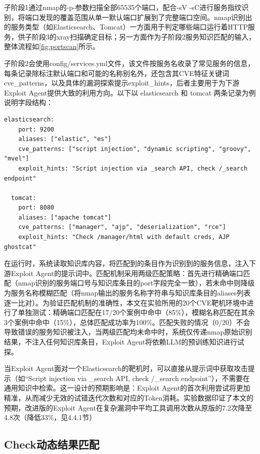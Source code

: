 子阶段1通过nmap的-p-参数扫描全部65535个端口，配合-sV -sC进行服务指纹识别，将端口发现的覆盖范围从单一默认端口扩展到了完整端口空间。nmap识别出的服务类型（如Elasticsearch、Tomcat）一方面用于判定哪些端口运行着HTTP服务，供子阶段3的xray扫描确定目标；另一方面作为子阶段2服务知识匹配的输入，整体流程如\cref{fig:portscan}所示。

子阶段2会使用config/services.yml文件，该文件按服务名收录了常见服务的信息，每条记录除标注默认端口和可能的名称别名外，还包含其CVE特征关键词cve\_patterns，以及具体的漏洞探索提示exploit\_hints，后者主要用于为下游Exploit Agent提供大致的利用方向。以下以 elasticsearch 和 tomcat 两条记录为例说明字段结构：

\begin{Verbatim}[mathescape=false]
  elasticsearch:
    port: 9200
    aliases: ["elastic", "es"]
    cve_patterns: ["script injection", "dynamic scripting", "groovy", "mvel"]
    exploit_hints: "Script injection via _search API, check /_search endpoint"

  tomcat:
    port: 8080
    aliases: ["apache tomcat"]
    cve_patterns: ["manager", "ajp", "deserialization", "rce"]
    exploit_hints: "Check /manager/html with default creds, AJP ghostcat"
\end{Verbatim}

在运行时，系统读取知识库内容，将匹配到的条目作为识别到的服务信息，注入下游Exploit Agent的提示词中。匹配机制采用两级匹配策略：首先进行精确端口匹配（nmap识别的服务端口号与知识库条目的port字段完全一致），若未命中则降级为服务名称模糊匹配（将nmap输出的服务名称字符串与知识库条目的aliases列表逐一比对）。为验证匹配机制的准确性，本文在实验所用的20个CVE靶机环境中进行了单独测试：精确端口匹配在17/20个案例中命中（85\%），模糊名称匹配在其余3个案例中命中（15\%），总体匹配成功率为100\%。匹配失败的情况（0/20）不会导致错误的服务知识被注入，当两级匹配均未命中时，系统仅传递nmap原始识别结果，不注入任何知识库条目，Exploit Agent将依赖LLM的预训练知识进行试探。

当Exploit Agent面对一个Elasticsearch的靶机时，可以直接从提示词中获取攻击提示（如“Script injection via \_search API, check /\_search endpoint”），不需要在通用知识中检索。这一设计的预期影响是：Exploit Agent的首次利用尝试将更加精准，从而减少无效的试错迭代次数和对应的Token消耗。实验数据印证了本文的预期，改进版的Exploit Agent在复杂漏洞中平均工具调用次数从原版的7.2次降至4.8次（降低33\%，见4.4.1节）


\subsection{Check动态结果匹配}

